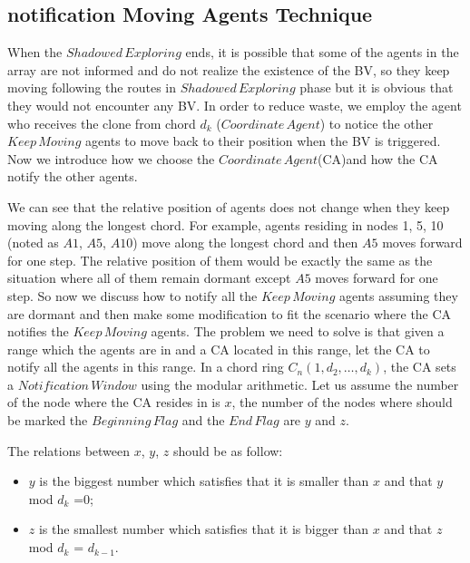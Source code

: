 \documentclass[conference]{IEEEtran}
\begin{document}
\subsection{notification Moving Agents Technique}


When the $Shadowed\,Exploring$ ends, it is possible that some of the agents in the array are not informed and do not realize the existence of the BV, so they keep moving following the routes in $Shadowed\,Exploring$  phase but it is obvious that they would not encounter any BV. In order to reduce waste, we employ the agent who receives the clone from chord $d_k$ ($Coordinate\,Agent$) to notice the other $Keep\,Moving$ agents to move back to their position when the BV is triggered. Now we introduce how we choose the $Coordinate\,Agent$(CA)and how the CA notify the other agents.\\


We can see that the relative position of agents does not change when they keep moving along the longest chord. For example, agents residing in nodes 1, 5, 10 (noted as $A1$, $A5$, $A10$) move along the longest chord and then $A5$ moves forward for one step. The relative position of them would be exactly the same as the situation where all of them remain dormant except $A5$ moves forward for one step. So now we discuss how to notify all the $Keep\,Moving$ agents assuming they are dormant and then make some modification to fit the scenario where the CA notifies the $Keep\,Moving$ agents. The problem we need to solve is that given a range which the agents are in and a CA located in this range, let the CA to notify all the agents in this range. In a chord ring $C_n(1, d_2, \ldots, d_k)$, the CA sets a $Notification\,Window$ using the modular arithmetic. Let us assume the number of the node where the CA resides in is $x$, the number of the nodes where should be marked the $Beginning\,Flag$ and the $End\,Flag$ are $y$ and $z$. 

The relations between $x$, $y$, $z$ should be as follow: 

\begin{itemize}
\item $y$ is the biggest number which satisfies that it is smaller than $x$ and that $y$ mod $d_k$ =$0$; 
\item $z$ is the smallest number which satisfies that it is bigger than $x$ and that $z$ mod $d_k$ = $d_{k-1}$.
\end{itemize} 
\end{document}
